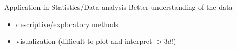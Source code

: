 \documentclass[
  ignorenonframetext,
]{beamer}
\begin{document}
\begin{frame}
\begin{frame}[label=DimensionReduction]
\vfill

  \begin{block}{Application in Statistics/Data analysis}
    \alert{Better understanding of the data}
    \begin{itemize}
      \item descriptive/exploratory methods
      \item visualization (difficult to plot and interpret $> 3d$!)
    \end{itemize}
  \end{block}

\end{frame}
\end{frame}
\end{document}
